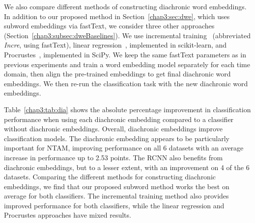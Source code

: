 We also compare different methods of constructing diachronic word embeddings. In addition to our proposed method in Section~\ref{chap3:sec:dwe}, which uses subword embeddings via fastText,
we consider three other approaches (Section~\ref{chap3:subsec:dweBaselines}).
We use incremental training~\cite{kim2014temporal} (abbreviated \textit{Incre}, using fastText),
linear regression~\cite{kulkarni2015statistically}, implemented in scikit-learn,
and Procrustes~\cite{hamilton2016diachronic}, implemented in SciPy.
We keep the same fastText parameters as in previous experiments and train a word embedding model separately for each time domain, then align the pre-trained embeddings to get final diachronic word embeddings. We then re-run the classification task with the new diachronic word embeddings. 

Table~\ref{chap3:tab:dia} shows the absolute percentage improvement in classification performance when using each diachronic embedding compared to a classifier without diachronic embeddings.
Overall, diachronic embeddings improve classification models.
The diachronic embedding appears to be particularly important for NTAM, improving performance on all 6 datasets with an average increase in performance up to 2.53 points.
The RCNN also benefits from diachronic embeddings, but to a lesser extent, with an improvement on 4 of the 6 datasets.
Comparing the different methods for constructing diachronic embeddings,
we find that our proposed subword method works the best on average for both classifiers. The incremental training method also provides improved performance for both classifiers, while the linear regression and Procrustes approaches have mixed results.




